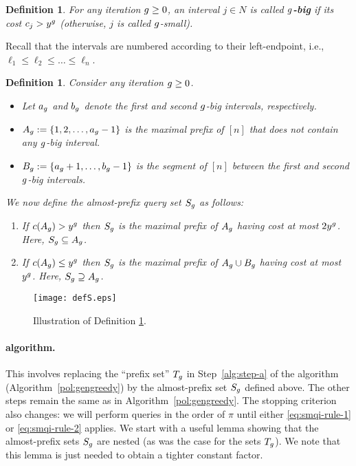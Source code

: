 \documentclass[11pt]{article}
\newcommand{\base}{y}
\newtheorem{defn}[thm]{Definition}
\theoremstyle{remark}
\theoremstyle{plain}
\theoremstyle{remark}
\begin{document}
\def\t{S}
\begin{defn}
    For any iteration $g\ge 0$,  an interval $j\in N$ is called {\bf $g$-big} if its cost $c_j>\base^\i$ (otherwise, $j$ is called $g$-small).  
\end{defn}
Recall that the intervals are numbered according to their left-endpoint, i.e., $\ell_1\le \ell_2\le \dots \le  \ell_n$. 
\begin{defn}
\label{def:S}
    Consider any iteration $g\ge 0$. 
    \begin{itemize}
        \item Let $a_g$ and $b_g$ denote the  first and second $g$-big intervals, respectively. 
    \item $A_g:=\{1,2,\dots, a_g-1\}$ is the maximal prefix of $[n]$  that does not contain any $g$-big interval.
    \item  $B_g:=\{a_g+1,\dots, b_g-1\}$ is the segment of $[n]$ between the  first and second $g$-big intervals.
    \end{itemize}
    We now define the almost-prefix query set $\t_\i$ as follows:
\begin{enumerate}
    \item If $c(A_g)> y^g$ then $S_g$ is the maximal prefix of $A_g$ having cost at most $2y^g$. Here, $\t_\i\subseteq A_\i$.
    \item    If $c(A_g)\le  y^g$ then $S_g$ is the maximal prefix of $A_g\cup B_g$ having cost at most $y^g$. Here, $\t_\i\supseteq A_\i$.
\end{enumerate}
    \end{defn}


\begin{figure}[h!]
    \centering
      \caption{Illustration of Definition \ref{def:S}.  }
\texttt{[image: defS.eps]}
\end{figure}
    
\paragraph{\smqi algorithm.} This involves replacing the ``prefix set'' $T_g $ in Step~\ref{alg:step-a} of the \smq algorithm (Algorithm~\ref{pol:gengreedy}) by the almost-prefix set $\t_\i$ defined above. The  other steps  remain the same as in Algorithm~\ref{pol:gengreedy}.  The stopping criterion also changes: we will perform queries in the order of $\pi$ until either \eqref{eq:smqi-rule-1} or \eqref{eq:smqi-rule-2} applies.  We start with a useful lemma showing that the almost-prefix sets $\t_\i$ are nested (as was the case for the sets $T_g$). We note that this lemma is just needed to obtain a tighter constant factor. 
\end{document}
